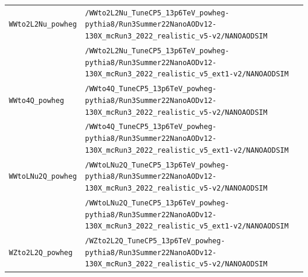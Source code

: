 \begin{longtable}{@{}>{\RaggedRight\arraybackslash}p{} >{\RaggedRight\arraybackslash}p{}@{}}
\addlinespace[2pt]
\texttt{WWto2L2Nu\_\allowbreak{}powheg} & \texttt{/\allowbreak{}WWto2L2Nu\_\allowbreak{}TuneCP5\_\allowbreak{}13p6TeV\_\allowbreak{}powheg-\allowbreak{}pythia8/\allowbreak{}Run3Summer22NanoAODv12-\allowbreak{}130X\_\allowbreak{}mcRun3\_\allowbreak{}2022\_\allowbreak{}realistic\_\allowbreak{}v5-\allowbreak{}v2/\allowbreak{}NANOAODSIM} \\
 & \texttt{/\allowbreak{}WWto2L2Nu\_\allowbreak{}TuneCP5\_\allowbreak{}13p6TeV\_\allowbreak{}powheg-\allowbreak{}pythia8/\allowbreak{}Run3Summer22NanoAODv12-\allowbreak{}130X\_\allowbreak{}mcRun3\_\allowbreak{}2022\_\allowbreak{}realistic\_\allowbreak{}v5\_\allowbreak{}ext1-\allowbreak{}v2/\allowbreak{}NANOAODSIM} \\
\addlinespace[2pt]
\texttt{WWto4Q\_\allowbreak{}powheg} & \texttt{/\allowbreak{}WWto4Q\_\allowbreak{}TuneCP5\_\allowbreak{}13p6TeV\_\allowbreak{}powheg-\allowbreak{}pythia8/\allowbreak{}Run3Summer22NanoAODv12-\allowbreak{}130X\_\allowbreak{}mcRun3\_\allowbreak{}2022\_\allowbreak{}realistic\_\allowbreak{}v5-\allowbreak{}v2/\allowbreak{}NANOAODSIM} \\
 & \texttt{/\allowbreak{}WWto4Q\_\allowbreak{}TuneCP5\_\allowbreak{}13p6TeV\_\allowbreak{}powheg-\allowbreak{}pythia8/\allowbreak{}Run3Summer22NanoAODv12-\allowbreak{}130X\_\allowbreak{}mcRun3\_\allowbreak{}2022\_\allowbreak{}realistic\_\allowbreak{}v5\_\allowbreak{}ext1-\allowbreak{}v2/\allowbreak{}NANOAODSIM} \\
\addlinespace[2pt]
\texttt{WWtoLNu2Q\_\allowbreak{}powheg} & \texttt{/\allowbreak{}WWtoLNu2Q\_\allowbreak{}TuneCP5\_\allowbreak{}13p6TeV\_\allowbreak{}powheg-\allowbreak{}pythia8/\allowbreak{}Run3Summer22NanoAODv12-\allowbreak{}130X\_\allowbreak{}mcRun3\_\allowbreak{}2022\_\allowbreak{}realistic\_\allowbreak{}v5-\allowbreak{}v2/\allowbreak{}NANOAODSIM} \\
 & \texttt{/\allowbreak{}WWtoLNu2Q\_\allowbreak{}TuneCP5\_\allowbreak{}13p6TeV\_\allowbreak{}powheg-\allowbreak{}pythia8/\allowbreak{}Run3Summer22NanoAODv12-\allowbreak{}130X\_\allowbreak{}mcRun3\_\allowbreak{}2022\_\allowbreak{}realistic\_\allowbreak{}v5\_\allowbreak{}ext1-\allowbreak{}v2/\allowbreak{}NANOAODSIM} \\
\addlinespace[2pt]
\texttt{WZto2L2Q\_\allowbreak{}powheg} & \texttt{/\allowbreak{}WZto2L2Q\_\allowbreak{}TuneCP5\_\allowbreak{}13p6TeV\_\allowbreak{}powheg-\allowbreak{}pythia8/\allowbreak{}Run3Summer22NanoAODv12-\allowbreak{}130X\_\allowbreak{}mcRun3\_\allowbreak{}2022\_\allowbreak{}realistic\_\allowbreak{}v5-\allowbreak{}v2/\allowbreak{}NANOAODSIM} \\

\end{longtable}
